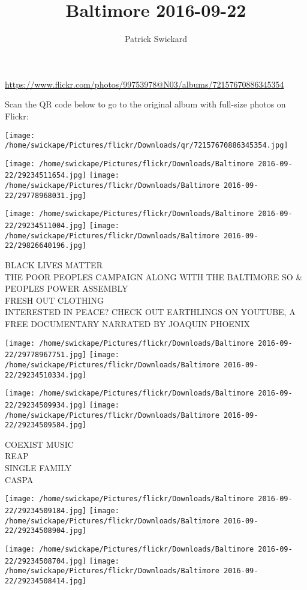 \documentclass[10pt,letterpaper]{article}
\title{Baltimore 2016-09-22}
\author{Patrick Swickard}
\date{}
\begin{document}
\maketitle

\url{https://www.flickr.com/photos/99753978@N03/albums/72157670886345354}

Scan the QR code below to go to the original album with full-size photos on Flickr:

\texttt{[image: /home/swickape/Pictures/flickr/Downloads/qr/72157670886345354.jpg]}
\pagebreak

\texttt{[image: /home/swickape/Pictures/flickr/Downloads/Baltimore 2016-09-22/29234511654.jpg]}
\texttt{[image: /home/swickape/Pictures/flickr/Downloads/Baltimore 2016-09-22/29778968031.jpg]}

\texttt{[image: /home/swickape/Pictures/flickr/Downloads/Baltimore 2016-09-22/29234511004.jpg]}
\texttt{[image: /home/swickape/Pictures/flickr/Downloads/Baltimore 2016-09-22/29826640196.jpg]}

BLACK LIVES MATTER\\
THE POOR PEOPLES CAMPAIGN ALONG WITH THE BALTIMORE SO \& PEOPLES POWER ASSEMBLY\\
FRESH OUT CLOTHING\\
INTERESTED IN PEACE?  CHECK OUT EARTHLINGS ON YOUTUBE, A FREE DOCUMENTARY NARRATED BY JOAQUIN PHOENIX
\pagebreak

\texttt{[image: /home/swickape/Pictures/flickr/Downloads/Baltimore 2016-09-22/29778967751.jpg]}
\texttt{[image: /home/swickape/Pictures/flickr/Downloads/Baltimore 2016-09-22/29234510334.jpg]}

\texttt{[image: /home/swickape/Pictures/flickr/Downloads/Baltimore 2016-09-22/29234509934.jpg]}
\texttt{[image: /home/swickape/Pictures/flickr/Downloads/Baltimore 2016-09-22/29234509584.jpg]}

COEXIST MUSIC\\
REAP\\
SINGLE FAMILY\\
CASPA
\pagebreak

\texttt{[image: /home/swickape/Pictures/flickr/Downloads/Baltimore 2016-09-22/29234509184.jpg]}
\texttt{[image: /home/swickape/Pictures/flickr/Downloads/Baltimore 2016-09-22/29234508904.jpg]}

\texttt{[image: /home/swickape/Pictures/flickr/Downloads/Baltimore 2016-09-22/29234508704.jpg]}
\texttt{[image: /home/swickape/Pictures/flickr/Downloads/Baltimore 2016-09-22/29234508414.jpg]}
\end{document}
